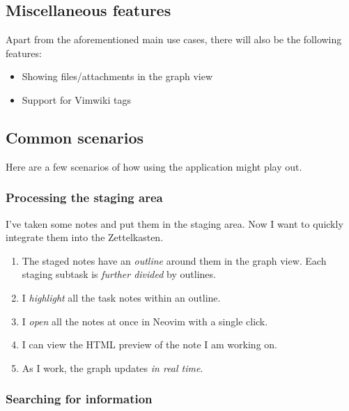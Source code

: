 \documentclass{article}
\begin{document}
\subsection{Miscellaneous features}

Apart from the aforementioned main use cases, there will also be the following features:

\begin{itemize}
	\item Showing files/attachments in the graph view

	\item Support for Vimwiki tags
\end{itemize}

\subsection{Common scenarios}

Here are a few scenarios of how using the application might play out.

\subsubsection{Processing the staging area}

I've taken some notes and put them in the staging area. Now I want to quickly integrate them into the Zettelkasten.

\begin{enumerate}
	\item The staged notes have an \emph{outline} around them in the graph view. Each staging subtask is \emph{further divided} by outlines.

	\item I \emph{highlight} all the task notes within an outline.

	\item I \emph{open} all the notes at once in Neovim with a single click.

	\item I can view the HTML preview of the note I am working on.

	\item As I work, the graph updates \emph{in real time}.
\end{enumerate}

\subsubsection{Searching for information}
\end{document}
